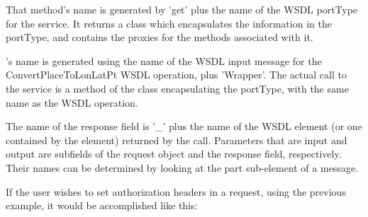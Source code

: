 That method's name is generated by 'get' plus the name of the WSDL portType
for the service.  It returns a class which
encapsulates the information in the portType, and contains the proxies
for the methods associated with it.

's
name is generated using
the name of the WSDL input message for the ConvertPlaceToLonLatPt
WSDL operation, plus 'Wrapper'.  The actual call to the service is a method of
the class encapsulating the portType, with the same name as the WSDL operation.

The name of the response field is '_' plus the name of the
WSDL element (or one contained by the element) returned by the call.
Parameters that are input and output are subfields of
the request object and the response field, respectively. 
Their names can be determined by looking at the part sub-element of a
message.

If the user wishes to set authorization headers in a request, using the 
previous example, it would be accomplished like this:

